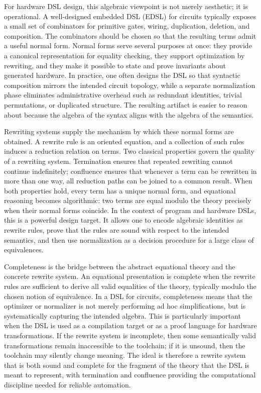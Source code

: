 \documentclass[11pt]{article}
\begin{document}
For hardware DSL design, this algebraic viewpoint is not merely aesthetic; it is operational. A well-designed embedded DSL (EDSL) for circuits typically exposes a small set of combinators for primitive gates, wiring, duplication, deletion, and composition. The combinators should be chosen so that the resulting terms admit a useful normal form. Normal forms serve several purposes at once: they provide a canonical representation for equality checking, they support optimization by rewriting, and they make it possible to state and prove invariants about generated hardware. In practice, one often designs the DSL so that syntactic composition mirrors the intended circuit topology, while a separate normalization phase eliminates administrative overhead such as redundant identities, trivial permutations, or duplicated structure. The resulting artifact is easier to reason about because the algebra of the syntax aligns with the algebra of the semantics.

Rewriting systems supply the mechanism by which these normal forms are obtained. A rewrite rule is an oriented equation, and a collection of such rules induces a reduction relation on terms. Two classical properties govern the quality of a rewriting system. Termination ensures that repeated rewriting cannot continue indefinitely; confluence ensures that whenever a term can be rewritten in more than one way, all reduction paths can be joined to a common result. When both properties hold, every term has a unique normal form, and equational reasoning becomes algorithmic: two terms are equal modulo the theory precisely when their normal forms coincide. In the context of program and hardware DSLs, this is a powerful design target. It allows one to encode algebraic identities as rewrite rules, prove that the rules are sound with respect to the intended semantics, and then use normalization as a decision procedure for a large class of equivalences.

Completeness is the bridge between the abstract equational theory and the concrete rewrite system. An equational presentation is complete when the rewrite rules are sufficient to derive all valid equalities of the theory, typically modulo the chosen notion of equivalence. In a DSL for circuits, completeness means that the optimizer or normalizer is not merely performing ad hoc simplifications, but is systematically capturing the intended algebra. This is particularly important when the DSL is used as a compilation target or as a proof language for hardware transformations. If the rewrite system is incomplete, then some semantically valid transformations remain inaccessible to the toolchain; if it is unsound, then the toolchain may silently change meaning. The ideal is therefore a rewrite system that is both sound and complete for the fragment of the theory that the DSL is meant to represent, with termination and confluence providing the computational discipline needed for reliable automation.
\end{document}

